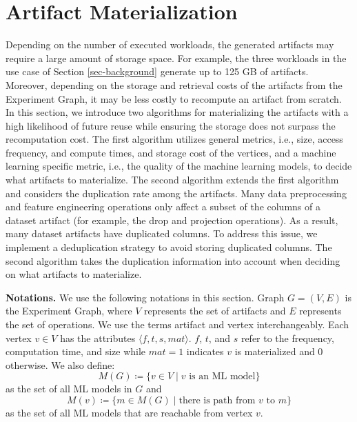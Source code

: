 \section{Artifact Materialization}\label{sec-materialization}
Depending on the number of executed workloads, the generated artifacts may require a large amount of storage space.
For example, the three workloads in the use case of Section \ref{sec-background} generate up to 125 GB of artifacts.
Moreover, depending on the storage and retrieval costs of the artifacts from the Experiment Graph, it may be less costly to recompute an artifact from scratch.
In this section, we introduce two algorithms for materializing the artifacts with a high likelihood of future reuse while ensuring the storage does not surpass the recomputation cost.
The first algorithm utilizes general metrics, i.e., size, access frequency, and compute times, and storage cost of the vertices, and a machine learning specific metric, i.e., the quality of the machine learning models, to decide what artifacts to materialize.
The second algorithm extends the first algorithm and considers the duplication rate among the artifacts.
Many data preprocessing and feature engineering operations only affect a subset of the columns of a dataset artifact (for example, the drop and projection operations).
As a result, many dataset artifacts have duplicated columns.
To address this issue, we implement a deduplication strategy to avoid storing duplicated columns.
The second algorithm takes the duplication information into account when deciding on what artifacts to materialize.

\textbf{Notations. }
We use the following notations in this section.
Graph $G = (V,E)$ is the Experiment Graph, where $V$ represents the set of artifacts and $E$ represents the set of operations.
We use the terms artifact and vertex interchangeably.
Each vertex $v \in V$ has the attributes $\langle f, t, s, mat \rangle$.
$f$, $t$, and $s$ refer to the frequency, computation time, and size while $mat=1$ indicates $v$ is materialized and $0$ otherwise.
We also define:
\[M(G) \coloneqq  \{v \in V \mid v \text{ is an ML model}\}\] as the set of all ML models in $G$ and 
\[M(v) \coloneqq  \{m \in M(G) \mid\text{there is path from } v \text{ to } m\}\] as the set of all ML models that are reachable from vertex $v$.

